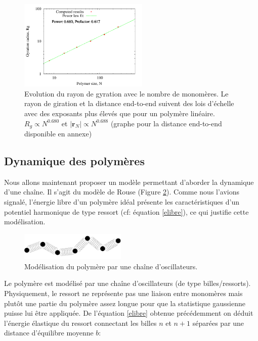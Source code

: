 \documentclass[a4paper,11pt]{article}
\begin{document}
\begin{figure}[H]
\begin{center}
\includegraphics[width=0.55\textwidth]{gyrationradius.pdf}
\caption{Evolution du rayon de gyration avec le nombre de monomères. Le rayon de giration et la distance end-to-end suivent des lois d'échelle avec des exposants plus élevés que pour un polymère linéaire. $R_g \propto N^{0.680}$ et $|\textbf{r}_N| \propto N^{0.688}$ (graphe pour la distance end-to-end disponible en annexe) }
\label{gyr}
\end{center}
\end{figure}




\subsection{Dynamique des polymères}

Nous allons maintenant proposer un modèle permettant d'aborder la dynamique d'une chaîne. Il s'agit du modèle de Rouse (Figure \ref{rouse}). Comme nous l'avions signalé, l'énergie libre d'un polymère idéal présente les caractéristiques d'un potentiel harmonique de type ressort (cf: équation \ref{elibre}), ce qui justifie cette modélisation.

\begin{figure}[H]
\begin{center}
\includegraphics[width=0.45\textwidth]{rouse.jpg}

\caption{Modélisation du polymère par une chaîne d'oscillateurs.}
\label{rouse}
\end{center}
\end{figure}

Le polymère est modélisé par une chaîne d'oscillateurs (de type billes/ressorts). Physiquement, le ressort ne représente pas une liaison entre monomères mais plutôt une partie du polymère assez longue pour que la statistique gaussienne puisse lui être appliquée. De l'équation \ref{elibre} obtenue précédemment on déduit l'énergie élastique du ressort connectant les billes $n$ et $n+1$ séparées par une distance d'équilibre moyenne $b$:
\end{document}
